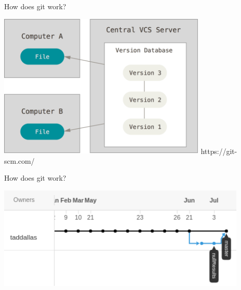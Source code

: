 \documentclass[12pt]{beamer}
\begin{document}
\begin{frame}

	\begin{flushright}
		\Large \textcolor{boss2}{How does git work?} 
	\end{flushright}

	\begin{center}
	  \includegraphics[width=0.75\textwidth]{figs/centralized.png}
		https://git-scm.com/
	\end{center}

\end{frame}











\begin{frame}

	\begin{flushright}
		\Large \textcolor{boss2}{How does git work?} 
	\end{flushright}

	\begin{center}
	  \includegraphics[width=\textwidth]{figs/gitHistory.png}
	\end{center}

\end{frame}
\end{document}
